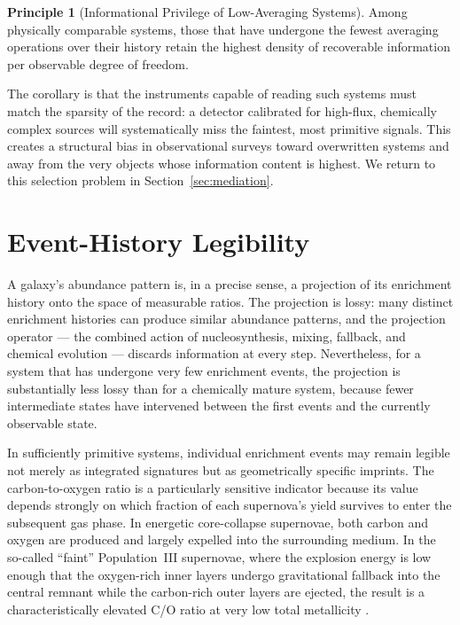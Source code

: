 \documentclass[12pt, a4paper]{article}
\theoremstyle{definition}
\newtheorem{principle}{Principle}
\begin{document}
\begin{principle}[Informational Privilege of Low-Averaging Systems]
Among physically comparable systems, those that have undergone the fewest
averaging operations over their history retain the highest density of
recoverable information per observable degree of freedom.
\end{principle}

The corollary is that the instruments capable of reading such systems must
match the sparsity of the record: a detector calibrated for high-flux,
chemically complex sources will systematically miss the faintest, most
primitive signals. This creates a structural bias in observational surveys
toward overwritten systems and away from the very objects whose information
content is highest. We return to this selection problem in Section~\ref{sec:mediation}.

\section{Event-History Legibility}
\label{sec:legibility}

A galaxy's abundance pattern is, in a precise sense, a projection of its
enrichment history onto the space of measurable ratios. The projection is
lossy: many distinct enrichment histories can produce similar abundance
patterns, and the projection operator --- the combined action of nucleosynthesis,
mixing, fallback, and chemical evolution --- discards information at every
step. Nevertheless, for a system that has undergone very few enrichment
events, the projection is substantially less lossy than for a chemically
mature system, because fewer intermediate states have intervened between the
first events and the currently observable state.

In sufficiently primitive systems, individual enrichment events may remain
legible not merely as integrated signatures but as geometrically specific
imprints. The carbon-to-oxygen ratio is a particularly sensitive indicator
because its value depends strongly on which fraction of each supernova's
yield survives to enter the subsequent gas phase. In energetic core-collapse
supernovae, both carbon and oxygen are produced and largely expelled into the
surrounding medium. In the so-called ``faint'' Population~III supernovae,
where the explosion energy is low enough that the oxygen-rich inner layers
undergo gravitational fallback into the central remnant while the carbon-rich
outer layers are ejected, the result is a characteristically elevated C/O
ratio at very low total metallicity \citep{Iwamoto2005, Nomoto2006}.
\end{document}
